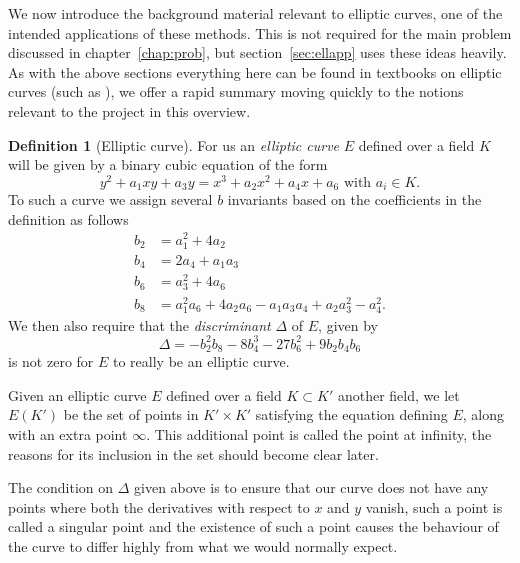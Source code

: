 \documentclass[12pt,a4paper,abstracton,bibtotoc]{scrreprt}
\theoremstyle{definition}
\newtheorem{defn}{Definition}
\begin{document}
We now introduce the background material relevant to elliptic curves, one of the intended applications of these methods.
This is not required for the main problem discussed in chapter~\ref{chap:prob}, but section~\ref{sec:ellapp} uses these ideas heavily.
As with the above sections everything here can be found in textbooks on elliptic curves (such as \cite{knapp}), we offer a rapid summary moving quickly to the notions relevant to the project in this overview.

\begin{defn}[Elliptic curve]
For us an \emph{elliptic curve} $E$ defined over a field $K$ will be given by a binary cubic equation of the form
\[
y^2 + a_1xy + a_3y = x^3 + a_2x^2 + a_4x + a_6\text{ with }a_i\in K.
\]
To such a curve we assign several $b$ invariants based on the coefficients in the definition as follows
\begin{align*}
b_2 &= a_1^2 + 4a_2\\
b_4 &= 2a_4 + a_1a_3\\
b_6 &= a_3^2 + 4a_6\\
b_8 &= a_1^2a_6 + 4a_2a_6 - a_1a_3a_4 + a_2a_3^2 -a_4^2.
\end{align*}
We then also require that the \emph{discriminant} $\Delta$ of $E$, given by
\[
\Delta = -b_2^2b_8 -8b_4^3 -27b_6^2 +9b_2b_4b_6
\]
is not zero for $E$ to really be an elliptic curve.

Given an elliptic curve $E$ defined over a field $K \subset K'$ another field, we let $E(K')$ be the set of points in $K'\times K'$ satisfying the equation defining $E$, along with an extra point $\infty$.
This additional point is called the point at infinity, the reasons for its inclusion in the set should become clear later.
\end{defn}

The condition on $\Delta$ given above is to ensure that our curve does not have any points where both the derivatives with respect to $x$ and $y$ vanish, such a point is called a singular point and the existence of such a point causes the behaviour of the curve to differ highly from what we would normally expect.
\end{document}
